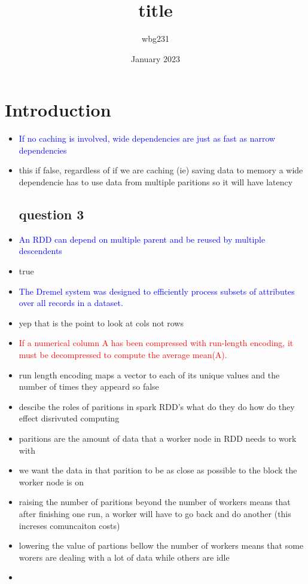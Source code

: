 \documentclass{article}
\title{title }
\author{wbg231 }
\date{January 2023}
\begin{document}
\maketitle

\section{Introduction}
\begin{itemize}
\subsection*{q1}
\item \textcolor{blue}{If no caching is involved, wide dependencies are just as fast as narrow dependencies }
\item this if false, regardless of if we are caching (ie) saving data to memory a wide dependencie has to use data from multiple paritions so it will have latency 
\subsection*{question 3}
\item \textcolor{blue}{An RDD can depend on multiple parent and be reused by multiple descendents}
\item true 
\item \textcolor{blue}{The Dremel system was designed to efficiently process subsets of attributes over all records in a dataset.}
\item yep that is the point to look at cols not rows
\item \textcolor{red}{If a numerical column A has been compressed with run-length encoding, it must be decompressed to compute the average mean(A).}
\item run length encoding maps a vector to each of its unique values and the number of times they appeard so false 
\item descibe the roles of paritions in spark RDD's what do they do how do they effect disrivuted computing
\item paritions are the amount of data that a worker node in RDD needs to work with 
\item we want the data in that parition to be as close as possible to the block the worker node is on 
\item raising the number of paritions beyond the number of workers means that after finishing one run, a worker will have to go back and do another (this increses comuncaiton costs) 
\item lowering the value of partions bellow the number of workers means that some worers are dealing with a lot of data while others are idle
\item 
\end{itemize}
\end{document}
